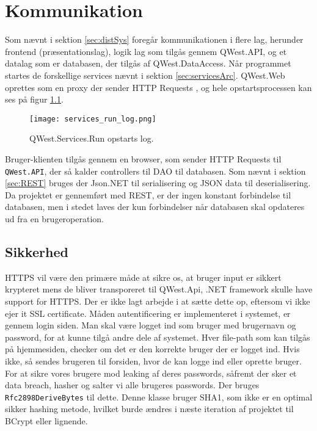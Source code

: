 \chapter{Kommunikation}\label{ch:communication}
Som nævnt i sektion \ref{sec:distSys} foregår kommunikationen i flere lag, herunder frontend (præsentationslag), logik lag som tilgås gennem QWest.API, og et datalag som er databasen, der tilgås af QWest.DataAccess. 
Når programmet startes de forskellige services nævnt i sektion \ref{sec:servicesArc}. QWest.Web oprettes som en proxy der sender HTTP Requests \cite{DistributedSystems}, og hele opstartsprocessen kan ses på figur \ref{fig:startup_log}.

\begin{figure}
    \texttt{[image: services\_run\_log.png]}
    \caption{QWest.Services.Run opstarts log.}
    \label{fig:startup_log}
\end{figure}

Bruger-klienten tilgås gennem en browser, som sender HTTP Requests til \texttt{QWest.API}, der så kalder controllers til DAO til databasen. Som nævnt i sektion \ref{sec:REST} bruges der Json.NET til serialisering og JSON data til deserialisering. Da projektet er gennemført med REST, er der ingen konstant forbindelse til databasen, men i stedet laves der kun forbindelser når databasen skal opdateres ud fra en brugeroperation. 

\section{Sikkerhed}\label{sec:security}
HTTPS vil være den primære måde at sikre os, at bruger input er sikkert krypteret mens de bliver transporeret til QWest.Api, .NET framework skulle have support for HTTPS. \cite{DotNetFrameworkSSL} Der er ikke lagt arbejde i at sætte dette op, eftersom vi ikke ejer it SSL certificate. 
Måden autentificering er implementeret i systemet, er gennem login siden. Man skal være logget ind som bruger med brugernavn og password, for at kunne tilgå andre dele af systemet. Hver file-path som kan tilgås på hjemmesiden, checker om det er den korrekte bruger der er logget ind. Hvis ikke, så sendes brugeren til forsiden, hvor de kan logge ind eller oprette bruger.
For at sikre vores brugere mod leaking af deres passwords, såfremt der sker et data breach, hasher og salter vi alle brugeres passwords. Der bruges \texttt{Rfc2898DeriveBytes} \cite{Rfc2898DeriveBytes} til dette. Denne klasse bruger SHA1, som ikke er en optimal sikker hashing metode, hvilket burde ændres i næste iteration af projektet \cite{HowsecureisSHA1} til BCrypt \cite{BCrypt} eller lignende.

